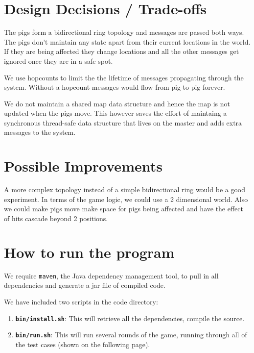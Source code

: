 \documentclass[]{article}
\begin{document}
\section{Design Decisions / Trade-offs}

The pigs form a bidirectional ring topology and messages are passed both
ways. The pigs don't maintain any state apart from their current
locations in the world. If they are being affected they change locations
and all the other messages get ignored once they are in a safe spot.

We use hopcounts to limit the the lifetime of messages propagating
through the system. Without a hopcount messages would flow from pig to
pig forever.

We do not maintain a shared map data structure and hence the map is not
updated when the pigs move. This however saves the effort of maintaing a
synchronous thread-safe data structure that lives on the master and adds
extra messages to the system.

\section{Possible Improvements}

A more complex topology instead of a simple bidirectional ring would be
a good experiment. In terms of the game logic, we could use a 2
dimensional world. Also we could make pigs move make space for pigs
being affected and have the effect of hits cascade beyond 2 positions.

\section{How to run the program}

We require \texttt{maven}, the Java dependency management tool, to pull
in all dependencies and generate a jar file of compiled code.

We have included two scripts in the code directory:

\begin{enumerate}[1.]
\item
  \textbf{\texttt{bin/install.sh}}: This will retrieve all the
  dependencies, compile the source.
\item
  \textbf{\texttt{bin/run.sh}}: This will run several rounds of the
  game, running through all of the test cases (shown on the following
  page).
\end{enumerate}

\pagebreak
\end{document}
